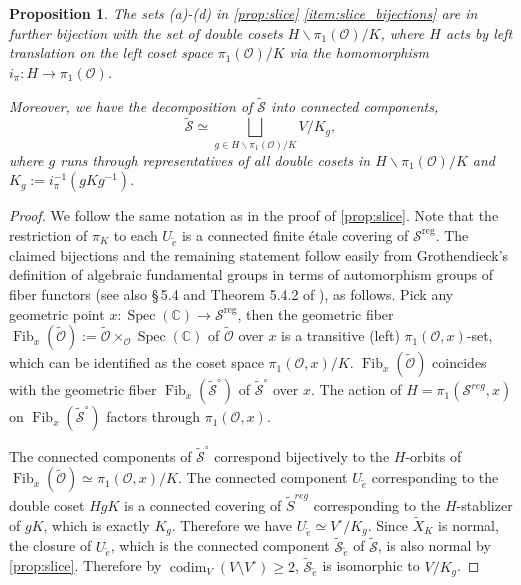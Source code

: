 \documentclass{amsart}
\newtheorem{proposition}[theorem]{Proposition}
\theoremstyle{definition}
\DeclareMathOperator{\codim}{codim}
\DeclareMathOperator{\reg}{reg}
\DeclareMathOperator{\spec}{Spec}
\newcommand{\C}{\mathbb{C}}
\newcommand{\cS}{\mathcal{S}}
\newcommand{\0}{\mathcal{O}}
\begin{document}
\begin{proposition}\label{prop:decomp}
	The sets (a)-(d) in \cref{prop:slice} \ref{item:slice_bijections} are in further bijection with the set of double cosets $H \backslash \pi_1(\0) / K$, where $H$ acts by left translation on the left coset space $\pi_1(\0) / K$ via the homomorphism $i_\pi: H \to \pi_1(\0)$.

	Moreover, we have the decomposition of $\widetilde{\cS}$ into connected components,
	\[
		\widetilde{\cS} \simeq \bigsqcup_{g \in H \backslash \pi_1(\0) / K } V/ K_g, 
	\]
	where $g$ runs through representatives of all double cosets in $H \backslash \pi_1(\0) / K$ and $K_g := i_\pi^{-1}(gK g^{-1})$.
\end{proposition}

\begin{proof}
	We follow the same notation as in the proof of \cref{prop:slice}.
	Note that the restriction of $\pi_K$ to each $U_{\widetilde{e}}$ is a connected finite \'{e}tale covering of $\cS^{\reg}$. The claimed bijections and the remaining statement follow easily from Grothendieck's definition of algebraic fundamental groups in terms of automorphism groups of fiber functors \cite{SGA1} (see also \S\,5.4 and Theorem 5.4.2 of \cite{Szamuely}), as follows. Pick any geometric point $x: \spec(\C) \to \cS^{\reg}$, then the geometric fiber $\operatorname{Fib}_x(\widetilde{\0}) := \widetilde{\0} \times_\0 \spec(\C)$ of $\widetilde{\0}$ over $x$ is a transitive (left) $\pi_1(\0, x)$-set, which can be identified as the coset space $\pi_1(\0, x) / K$. $\operatorname{Fib}_x(\widetilde{\0})$ coincides with the geometric fiber $\operatorname{Fib}_x(\widetilde{\cS}^\circ)$ of $\widetilde{\cS}^\circ$ over $x$. The action of $H = \pi_1(\cS^{reg}, x)$ on $\operatorname{Fib}_x(\widetilde{\cS}^\circ)$ factors through $\pi_1(\0,x)$. 
	
	The connected components of $\widetilde{\cS}^\circ$ correspond bijectively to the $H$-orbits of $\operatorname{Fib}_x(\widetilde{\0}) \simeq \pi_1(\0, x) / K$. The connected component $U_{\widetilde{e}}$ corresponding to the double coset $H g K$ is a connected covering of $\widetilde{S}^{reg}$ corresponding to the $H$-stablizer of $gK$, which is exactly $K_g$. Therefore we have $U_{\widetilde{e}} \simeq V^\circ / K_g$. Since $\widetilde{X}_K$ is normal, the closure  of $U_{\widetilde{e}}$, which is the connected component $\widetilde{\cS}_{\widetilde{e}}$ of $\widetilde{\cS}$, is also normal by \cref{prop:slice}. Therefore by $\codim_V(V \setminus V^\circ) \geq 2$,  $\widetilde{\cS}_{\widetilde{e}}$ is isomorphic to $V/K_g$.
\end{proof}
\end{document}
